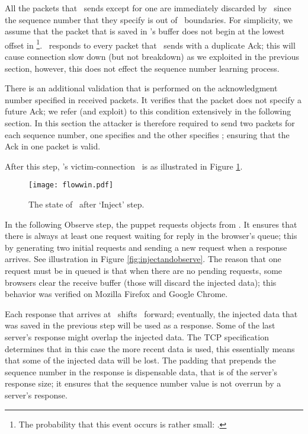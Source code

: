 \documentclass[conference]{IEEEtran}
\newcommand{\wnd}{}
\newcommand{\cwnd}{}
\begin{document}
All the packets that \mal\ sends except for one are immediately discarded by \wini\ since the sequence number that they specify is out of \wnd\ boundaries. For simplicity, we assume that the packet that is saved in \wini's buffer does not begin at the lowest offset in \wnd\footnote{The probability that this event occurs is rather small: .}. \wini\ responds to every packet that \mal\ sends with a duplicate Ack; this will cause connection slow down (but not breakdown) as we exploited in the previous section, however, this does not effect the sequence number learning process. 

There is an additional validation that is performed on the acknowledgment number specified in received packets. It verifies that the packet does not specify a future Ack; we refer (and exploit) to this condition extensively in the following section. In this section the attacker is therefore required to send two packets for each sequence number, one specifies  and the other specifies ; ensuring that the Ack in one packet is valid.

After this step, \wini's victim-connection \wnd\ is as illustrated in Figure \ref{fig:flowcontrolwin1}. 

\begin{figure}
  \begin{center}
    \texttt{[image: flowwin.pdf]}
  \end{center}
  \caption{The state of \wnd\ after `Inject' step.}
    \label{fig:flowcontrolwin1}
\end{figure}

In the following Observe step, the puppet requests objects from \lin. It ensures that there is always at least one request waiting for reply in the browser's queue; this by generating two initial requests and sending a new request when a response arrives. See illustration in Figure \ref{fig:injectandobserve}. The reason that one request must be in queued is that when there are no pending requests, some browsers clear the receive buffer (those will discard the injected data); this behavior was verified on Mozilla Firefox and Google Chrome. 

Each response that arrives at \wini\ shifts \cwnd\ forward; eventually, the injected data that was saved in the previous step will be used as a response. Some of the last server's response might overlap the injected data. The TCP specification determines that in this case the more recent data is used, this essentially means that some of the injected data will be lost. The padding that prepends the sequence number in the response is dispensable data, that is of the server's response size; it ensures that the sequence number value is not overrun by a server's response. 
\end{document}
